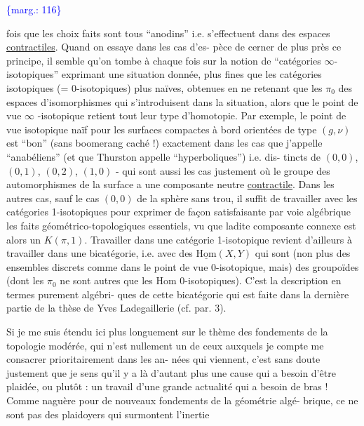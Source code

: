 \documentclass[11pt]{article}
\newcommand{\scanpage}[1]{\par\bigskip\noindent{\small\sffamily[scan #1]}\par}
\newcommand{\mspage}[1]{{\small\sffamily[p.\,#1]}}
\newcommand{\margin}[1]{\textcolor{blue}{\{\textsf{marg.:} #1\}}}
\newcommand{\uline}[1]{\underline{#1}}
\begin{document}
\margin{116}

\clearpage
\scanpage{119/117}
\mspage{39}

fois que les choix faits sont tous ``anodins'' i.e. s'effectuent
dans des espaces \uline{contractiles}. Quand on essaye dans les cas d'es-%
pèce de cerner de plus près ce principe, il semble qu'on tombe à
chaque fois sur la notion de ``catégories $\infty$- isotopiques'' exprimant
une situation donnée, plus fines que les catégories isotopiques
(= 0-isotopiques) plus naïves, obtenues en ne retenant que les $\pi_0$
des espaces d'isomorphismes qui s'introduisent dans la situation,
alors que le point de vue $\infty$ -isotopique retient tout leur type
d'homotopie. Par exemple, le point de vue isotopique naïf pour
les surfaces compactes à bord orientées de type $(g,\nu)$ est ``bon''
(sans boomerang caché !) exactement dans les cas que j'appelle
``anabéliens'' (et que Thurston appelle ``hyperboliques'') i.e. dis-%
tincts de $(0,0)$, $(0,1)$, $(0,2)$, $(1,0)$ - qui sont aussi les cas
justement où le groupe des automorphismes de la surface a une
composante neutre \uline{contractile}. Dans les autres cas, sauf le cas
$(0,0)$ de la sphère sans trou, il suffit de travailler avec les
catégories 1-isotopiques pour exprimer de façon satisfaisante par
voie algébrique les faits géométrico-topologiques essentiels, vu
que ladite composante connexe est alors un $K(\pi,1)$. Travailler
dans une catégorie 1-isotopique revient d'ailleurs à travailler
dans une bicatégorie, i.e. avec des $\underline{\mathrm{Hom}}(X,Y)$ qui sont (non plus
des ensembles discrets comme dans le point de vue 0-isotopique,
mais) des groupoïdes (dont les $\pi_0$ ne sont autres que les Hom
0-isotopiques). C'est la description en termes purement algébri-%
ques de cette bicatégorie qui est faite dans la dernière partie
de la thèse de Yves Ladegaillerie (cf. par. 3).

Si je me suis étendu ici plus longuement sur le thème
des fondements de la topologie modérée, qui n'est nullement un de
ceux auxquels je compte me consacrer prioritairement dans les an-%
nées qui viennent, c'est sans doute justement que je sens qu'il
y a là d'autant plus une cause qui a besoin d'être plaidée, ou
plutôt : un travail d'une grande actualité qui a besoin de bras !
Comme naguère pour de nouveaux fondements de la géométrie algé-%
brique, ce ne sont pas des plaidoyers qui surmontent l'inertie
\end{document}
